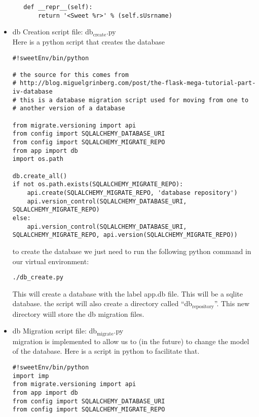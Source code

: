 \documentclass[11pt]{article}
\begin{document}
\begin{itemize}
\begin{verbatim}
   def __repr__(self):
       return '<Sweet %r>' % (self.sUsrname)
\end{verbatim}



\item db Creation script file: db$_{\mathrm{create}}$.py\\
\label{sec-4-2-1-5}%
Here is a python script that creates the database


\begin{verbatim}
#!sweetEnv/bin/python

# the source for this comes from 
# http://blog.miguelgrinberg.com/post/the-flask-mega-tutorial-part-iv-database
# this is a database migration script used for moving from one to 
# another version of a database

from migrate.versioning import api
from config import SQLALCHEMY_DATABASE_URI
from config import SQLALCHEMY_MIGRATE_REPO
from app import db
import os.path

db.create_all()
if not os.path.exists(SQLALCHEMY_MIGRATE_REPO):
    api.create(SQLALCHEMY_MIGRATE_REPO, 'database repository')
    api.version_control(SQLALCHEMY_DATABASE_URI, SQLALCHEMY_MIGRATE_REPO)
else:
    api.version_control(SQLALCHEMY_DATABASE_URI, SQLALCHEMY_MIGRATE_REPO, api.version(SQLALCHEMY_MIGRATE_REPO))
\end{verbatim}

to create the database we just need to run the following python
command in our virtual environment:

\begin{verbatim}
./db_create.py
\end{verbatim}
This will create a database with the label app.db file. This will be a
sqlite database. the script will also create a directory called
``db$_{\mathrm{repository}}$''. This new directory wiill store the db migration files.



\item db Migration script file: db$_{\mathrm{migrate}}$.py\\
\label{sec-4-2-1-6}%
migration is implemented to allow us to (in the future) to change the
model of the database. Here is a script in python to facilitate that.


\begin{verbatim}
#!sweetEnv/bin/python
import imp
from migrate.versioning import api
from app import db
from config import SQLALCHEMY_DATABASE_URI
from config import SQLALCHEMY_MIGRATE_REPO


\end{verbatim}
\end{itemize}
\end{document}
